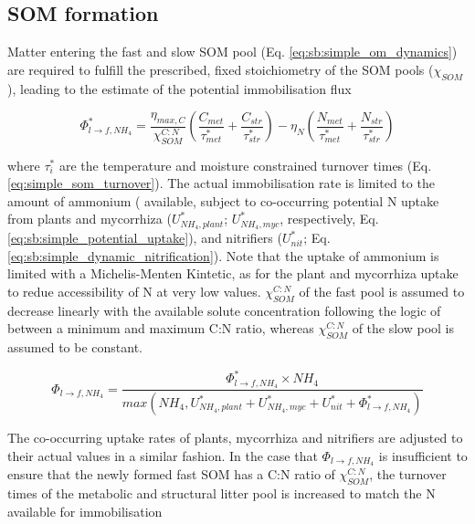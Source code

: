 \subsection{SOM formation}\label{sec:sb:formation}

Matter entering the fast and slow SOM pool (Eq. \ref{eq:sb:simple_om_dynamics}) are required to fulfill the prescribed, fixed stoichiometry of the SOM pools ($\chi_{SOM}$), leading to the estimate of the potential immobilisation flux

\begin{equation}\label{eq:sb:simple_pot_n_immobilisation}
\Phi^{*}_{l \rightarrow f, NH_4} = \frac{\eta_{max,C}}{\chi_{SOM}^{C:N}} (\frac{C_{met}}{\tau^{*}_{met}} + \frac{C_{str}}{\tau^{*}_{str}}) - \eta_N (\frac{N_{met}}{\tau^{*}_{met}} + \frac{N_{str}}{\tau^{*}_{str}})
\end{equation} 

where $\tau^{*}_i$ are the temperature and moisture constrained turnover times (Eq. \ref{eq:simple_som_turnover}). The actual immobilisation rate is limited to the amount of ammonium ( available, subject to co-occurring potential N uptake from plants and mycorrhiza ($U^{*}_{NH_4,plant}$; $U^{*}_{NH_4,myc}$, respectively, Eq. \ref{eq:sb:simple_potential_uptake}), and nitrifiers ($U^{*}_{nit}$; Eq. \ref{eq:sb:simple_dynamic_nitrification}). Note that the uptake of ammonium is limited with a Michelis-Menten Kintetic, as for the plant and mycorrhiza uptake to redue accessibility of N at very low values. $\chi_{SOM}^{C:N}$ of the fast pool is assumed to decrease linearly with the available  solute concentration following the logic of \cite{Parton:1993ud} between a minimum and maximum C:N ratio, whereas $\chi_{SOM}^{C:N}$ of the slow pool is assumed to be constant. 

\begin{equation}\label{eq:sb:simple_act_n_immobilisation}
\Phi_{l \rightarrow f, NH_4} = \frac{\Phi^{*}_{l \rightarrow f, NH_4} \times NH_4}{max(NH_4, U^{*}_{NH_4,plant} + U^{*}_{NH_4,myc} + U^{*}_{nit} + \Phi^{*}_{l \rightarrow f, NH_4})}   
\end{equation}

The co-occurring uptake rates of plants, mycorrhiza and nitrifiers are adjusted to their actual values in a similar fashion. In the case that $\Phi_{l \rightarrow f, NH_4}$ is insufficient to ensure that the newly formed fast SOM has a C:N ratio of $\chi_{SOM}^{C:N}$, the turnover times of the metabolic and structural litter pool is increased to match the N available for immobilisation

